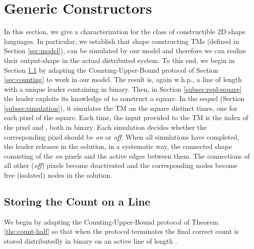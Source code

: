 \documentclass[oribibl, 11pt]{llncs}
\begin{document}
\section{Generic Constructors}
\label{sec:gen-con}

In this section, we give a characterization for the class of constructible 2D shape languages. In particular, we establish that shape constructing TMs (defined in Section \ref{sec:model}), can be simulated by our model and therefore we can realize their output-shape in the actual distributed system. To this end, we begin in Section \ref{subsec:counting-line} by adapting the Counting-Upper-Bound protocol of Section \ref{sec:counting} to work in our model. The result is, again w.h.p., a line of length  with a unique leader containing  in binary. Then, in Section \ref{subsec:repl-square} the leader exploits its knowledge of  to construct a  square. In the sequel (Section \ref{subsec:simulation}), it simulates the TM on the square  distinct times, one for each pixel of the square. Each time, the input provided to the TM is the index of the pixel and , both in binary. Each simulation decides whether the corresponding pixel should be \emph{on} or \emph{off}. When all simulations have completed, the leader releases in the solution, in a systematic way, the connected shape consisting of the \emph{on} pixels and the active edges between them. The connections of all other (\emph{off}) pixels become deactivated and the corresponding nodes become free (isolated) nodes in the solution. 

\subsection{Storing the Count on a Line}
\label{subsec:counting-line}

We begin by adapting the Counting-Upper-Bound protocol of Theorem \ref{the:count-half} so that when the protocol terminates the final correct count is stored distributedly in binary on an active line of length .\\
\end{document}
